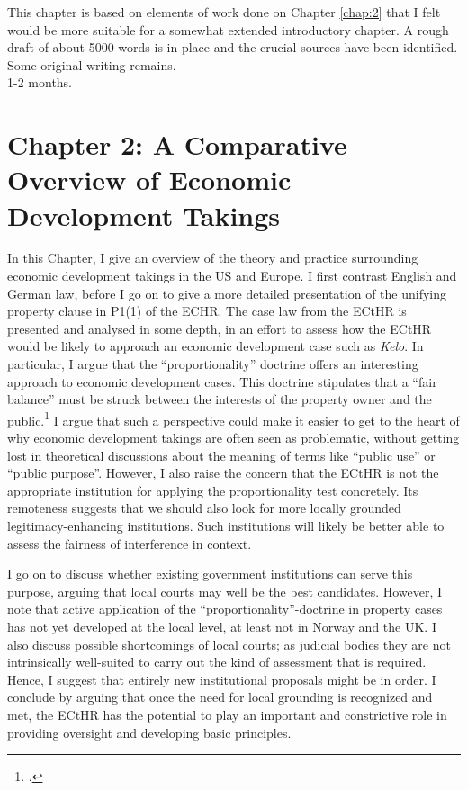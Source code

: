 \documentclass[12pt,a4paper]{article} %
\begin{document}
 This chapter is based on elements of work done on Chapter \ref{chap:2} that I felt would be more suitable for a somewhat extended introductory chapter. A rough draft of about 5000 words is in place and the crucial sources have been identified. Some original writing remains. \\

 1-2 months.

\section*{Chapter 2: A Comparative Overview of Economic Development Takings}\label{chap:2}

In this Chapter, I give an overview of the theory and practice surrounding economic development takings in the US and Europe. I first contrast English and German law, before I go on to give a more detailed presentation of the unifying property clause in P1(1) of the ECHR. The case law from the ECtHR is presented and analysed in some depth, in an effort to assess how the ECtHR would be likely to approach an economic development case such as {\it Kelo}. In particular, I argue that the ``proportionality'' doctrine offers an interesting approach to economic development cases. This doctrine stipulates that a ``fair balance'' must be struck  between the interests of the property owner and the public.\footcite[Chapter 5]{allen05} I argue that such a perspective could make it easier to get to the heart of why economic development takings are often seen as problematic, without getting lost in theoretical discussions about the meaning of  terms like ``public use'' or ``public purpose''. However, I also raise the concern that the ECtHR is not the appropriate institution for applying the proportionality test concretely. Its remoteness suggests that we should also look for more locally grounded legitimacy-enhancing institutions. Such institutions will likely be better able to assess the fairness of interference in context.

I go on to discuss whether existing government institutions can serve this purpose, arguing that local courts may well be the best candidates. However, I note that active application of the ``proportionality''-doctrine in property cases has not yet developed at the local level, at least not in Norway and the UK. I also discuss possible shortcomings of local courts; as judicial bodies they are not intrinsically well-suited to carry out the kind of assessment that is required. Hence, I suggest that entirely new institutional proposals might be in order. I conclude by arguing that once the need for local grounding is recognized and met, the ECtHR has the potential to play an important and constrictive role in providing oversight and developing basic principles.
\end{document}
